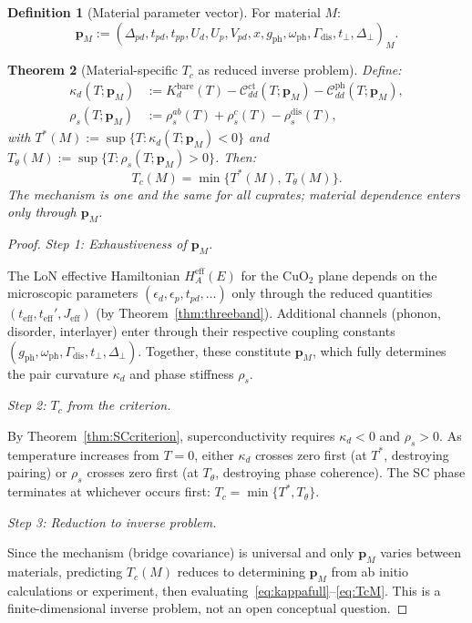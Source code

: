 \documentclass[12pt]{article}
\theoremstyle{plain}
\newtheorem{theorem}{Theorem}[section]
\theoremstyle{definition}
\newtheorem{definition}[theorem]{Definition}
\numberwithin{equation}{section}
\newcommand{\eff}{\mathrm{eff}}
\begin{document}
\begin{definition}[Material parameter vector]
For material $M$:
\begin{equation}\label{eq:pvec}
\bm{p}_M := (\Delta_{pd},t_{pd},t_{pp},U_d,U_p,V_{pd},
x,g_{\mathrm{ph}},\omega_{\mathrm{ph}},
\Gamma_{\mathrm{dis}},t_\perp,\Delta_\perp)_M.
\end{equation}
\end{definition}

\begin{theorem}[Material-specific $T_c$ as reduced inverse problem]\label{thm:materialTc}
Define:
\begin{align}
\kappa_d(T;\bm{p}_M) &:= K_d^{\mathrm{bare}}(T)
- \mathcal{C}_{dd}^{\mathrm{ct}}(T;\bm{p}_M)
- \mathcal{C}_{dd}^{\mathrm{ph}}(T;\bm{p}_M),
\label{eq:kappafull}\\
\rho_s(T;\bm{p}_M) &:= \rho_s^{ab}(T)
+ \rho_s^c(T) - \rho_s^{\mathrm{dis}}(T),
\label{eq:rhosfull}
\end{align}
with $T^*(M):=\sup\{T:\kappa_d(T;\bm{p}_M)<0\}$ and
$T_\theta(M):=\sup\{T:\rho_s(T;\bm{p}_M)>0\}$.  Then:
\begin{equation}\label{eq:TcM}
\boxed{T_c(M) = \min\{T^*(M),\,T_\theta(M)\}.}
\end{equation}
The mechanism is one and the same for all cuprates; material
dependence enters only through $\bm{p}_M$.
\end{theorem}

\begin{proof}
\emph{Step 1: Exhaustiveness of $\bm{p}_M$.}

The LoN effective Hamiltonian
$H_A^{\eff}(E)$ for the CuO$_2$ plane depends on the microscopic
parameters $(\epsilon_d,\epsilon_p,t_{pd},\ldots)$ only through
the reduced quantities $(t_{\eff},t_{\eff}',J_{\eff})$ (by
Theorem~\ref{thm:threeband}).  Additional channels (phonon,
disorder, interlayer) enter through their respective coupling
constants $(g_{\mathrm{ph}},\omega_{\mathrm{ph}},
\Gamma_{\mathrm{dis}},t_\perp,\Delta_\perp)$.  Together, these
constitute $\bm{p}_M$, which fully determines the pair curvature
$\kappa_d$ and phase stiffness $\rho_s$.

\emph{Step 2: $T_c$ from the criterion.}

By Theorem~\ref{thm:SCcriterion}, superconductivity requires
$\kappa_d<0$ and $\rho_s>0$.  As temperature increases from $T=0$,
either $\kappa_d$ crosses zero first (at $T^*$, destroying pairing)
or $\rho_s$ crosses zero first (at $T_\theta$, destroying phase
coherence).  The SC phase terminates at whichever occurs first:
$T_c=\min\{T^*,T_\theta\}$.

\emph{Step 3: Reduction to inverse problem.}

Since the mechanism (bridge covariance) is universal and only
$\bm{p}_M$ varies between materials, predicting $T_c(M)$ reduces
to determining $\bm{p}_M$ from ab initio calculations or
experiment, then evaluating~\eqref{eq:kappafull}--\eqref{eq:TcM}.
This is a finite-dimensional inverse problem, not an open
conceptual question.
\end{proof}
\end{document}
